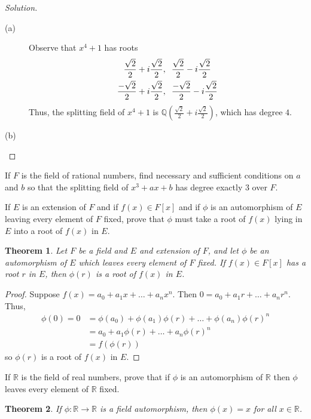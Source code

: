 \documentclass[12pt,leqno]{article}
\numberwithin{equation}{section}
\newcommand{\question}[2] {\vspace{.25in} \noindent\fbox{#1} #2 \vspace{.10in}}
\newtheorem*{Thm}{Theorem}
\theoremstyle{definition}
\begin{document}
\begin{proof}[Solution]
 \begin{description}
  \item [(a)] Observe that $x^4+1$ has roots \begin{align*}\frac{\sqrt{2}}{2}+i\frac{\sqrt{2}}{2},&\hskip.1in \frac{\sqrt{2}}{2}-i\frac{\sqrt{2}}{2}\\\frac{-\sqrt{2}}{2}+i\frac{\sqrt{2}}{2},&\hskip.1in \frac{-\sqrt{2}}{2}-i\frac{\sqrt{2}}{2}\end{align*} Thus, the splitting field of $x^4+1$ is $\mathbb{Q}(\frac{\sqrt{2}}{2}+i\frac{\sqrt{2}}{2})$, which has degree $4$.
 \item [(b)]
 \end{description}
\end{proof}

\question{9}{If $F$ is the field of rational numbers, find necessary and sufficient conditions on $a$ and $b$ so that the splitting field of $x^3+ax+b$ has degree exactly $3$ over $F$.}

\question{11}{If $E$ is an extension of $F$ and if $f(x)\in F[x]$ and if $\phi$ is an automorphism of $E$ leaving every element of $F$ fixed, prove that $\phi$ must take a root of $f(x)$ lying in $E$ into a root of $f(x)$ in $E$.}

\begin{Thm}
 Let $F$ be a field and $E$ and extension of $F$, and let $\phi$ be an automorphism of $E$ which leaves every element of $F$ fixed. If $f(x)\in F[x]$ has a root $r$ in $E$, then $\phi(r)$ is a root of $f(x)$ in $E$.
\end{Thm}

\begin{proof}
 Suppose $f(x)=a_0+a_1x+\hdots+a_nx^n$. Then $0=a_0+a_1r+\hdots+a_nr^n$. Thus, \begin{align*}\phi(0)=0&=\phi(a_0)+\phi(a_1)\phi(r)+\hdots+\phi(a_n)\phi(r)^n\\&=a_0+a_1\phi(r)+\hdots+a_n\phi(r)^n\\&=f(\phi(r))\end{align*} so $\phi(r)$ is a root of $f(x)$ in $E$.
\end{proof}

\question{15}{If $\mathbb{R}$ is the field of real numbers, prove that if $\phi$ is an automorphism of $\mathbb{R}$ then $\phi$ leaves every element of $\mathbb{R}$ fixed.}

\begin{Thm}
 If $\phi:\mathbb{R}\to\mathbb{R}$ is a field automorphism, then $\phi(x)=x$ for all $x\in\mathbb{R}$.
\end{Thm}
\end{document}
